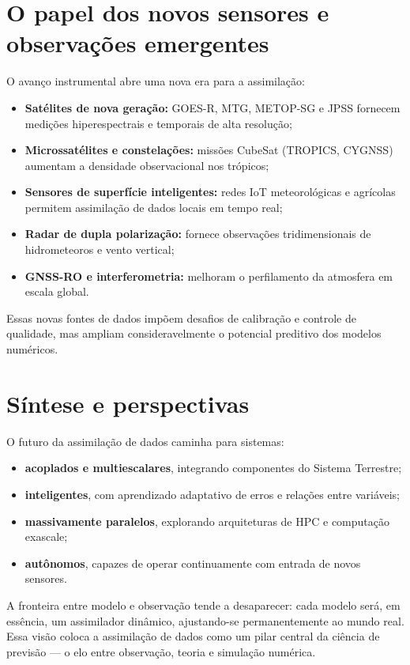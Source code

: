 \section{O papel dos novos sensores e observações emergentes}
O avanço instrumental abre uma nova era para a assimilação:
\begin{itemize}
  \item \textbf{Satélites de nova geração:} GOES-R, MTG, METOP-SG e JPSS fornecem medições hiperespectrais e temporais de alta resolução;
  \item \textbf{Microssatélites e constelações:} missões CubeSat (TROPICS, CYGNSS) aumentam a densidade observacional nos trópicos;
  \item \textbf{Sensores de superfície inteligentes:} redes IoT meteorológicas e agrícolas permitem assimilação de dados locais em tempo real;
  \item \textbf{Radar de dupla polarização:} fornece observações tridimensionais de hidrometeoros e vento vertical;
  \item \textbf{GNSS-RO e interferometria:} melhoram o perfilamento da atmosfera em escala global.
\end{itemize}

Essas novas fontes de dados impõem desafios de calibração e controle de qualidade, mas ampliam consideravelmente o potencial preditivo dos modelos numéricos.

\section{Síntese e perspectivas}
O futuro da assimilação de dados caminha para sistemas:
\begin{itemize}
  \item \textbf{acoplados e multiescalares}, integrando componentes do Sistema Terrestre;
  \item \textbf{inteligentes}, com aprendizado adaptativo de erros e relações entre variáveis;
  \item \textbf{massivamente paralelos}, explorando arquiteturas de HPC e computação exascale;
  \item \textbf{autônomos}, capazes de operar continuamente com entrada de novos sensores.
\end{itemize}

A fronteira entre modelo e observação tende a desaparecer: cada modelo será, em essência, um assimilador dinâmico, ajustando-se permanentemente ao mundo real.
Essa visão coloca a assimilação de dados como um pilar central da ciência de previsão — o elo entre observação, teoria e simulação numérica.

